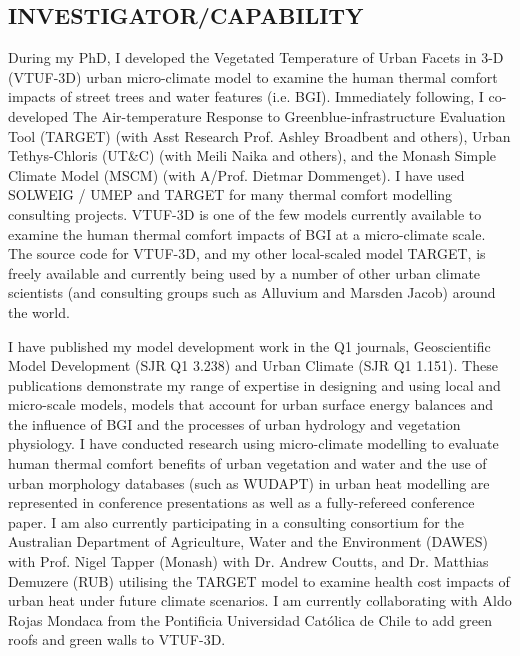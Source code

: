 \subsection*{\TitleFont INVESTIGATOR/CAPABILITY}


During my PhD, I developed the Vegetated Temperature of Urban Facets in 3-D (VTUF-3D)\cite{Nice2018a} urban micro-climate model to examine the human thermal comfort impacts of street trees and water features (i.e. BGI). Immediately following, I co-developed The Air-temperature Response to Greenblue-infrastructure Evaluation Tool (TARGET)\cite{Broadbent2019c} (with Asst Research Prof. Ashley Broadbent and others), Urban Tethys-Chloris (UT\&C)\cite{Meili2020} (with Meili Naika and others), and the Monash Simple Climate Model\cite{Dommenget2019} (MSCM) (with A/Prof. Dietmar Dommenget). I have used SOLWEIG / UMEP\cite{Lindberg2018} and TARGET for many thermal comfort modelling consulting projects. VTUF-3D is one of the few models currently available to examine the human thermal comfort impacts of BGI at a micro-climate scale. The source code for VTUF-3D, and my other local-scaled model TARGET, is freely available and currently being used by a number of other urban climate scientists (and consulting groups such as Alluvium\cite{MosiacInsights2020} and Marsden Jacob) around the world. 

I have published my model development work\cite{Nice2018a,Broadbent2019c,Meili2020,Dommenget2019} in the Q1 journals, Geoscientific Model Development (SJR Q1 3.238) and Urban Climate (SJR Q1 1.151). These publications demonstrate my range of expertise in designing and using local and micro-scale models, models that account for urban surface energy balances and the influence of BGI and the processes of urban hydrology and vegetation physiology. I have conducted research using micro-climate modelling to evaluate human thermal comfort benefits of urban vegetation and water and the use of urban morphology databases (such as WUDAPT) in urban heat modelling are represented in conference presentations\cite{Gal2020,Nice2020b} as well as a fully-refereed conference paper\cite{Todorovic2019a}. I am also currently participating in a consulting consortium for the Australian Department of Agriculture, Water and the Environment (DAWES) with Prof. Nigel Tapper (Monash) with Dr. Andrew Coutts, and Dr. Matthias Demuzere (RUB) utilising the TARGET model to examine health cost impacts of urban heat under future climate scenarios. I am currently collaborating with Aldo Rojas Mondaca from the Pontificia Universidad Cat\'{o}lica de Chile to add green roofs and green walls to VTUF-3D.

